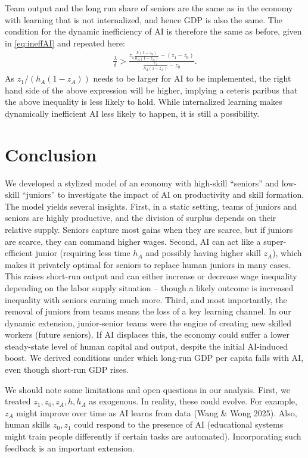 \documentclass[12pt]{article}
\begin{document}
{Team output and the long run share of seniors are the same as in the economy with learning that is not internalized, and hence GDP is also the same. The condition for the dynamic inefficiency of AI is therefore the same as before, given in \eqref{eq:ineffAI} and repeated here:
\begin{align*}
\frac{\lambda}{\delta}>\frac{z_1\frac{h(1-z_0)}{h_A(1-z_A)}-(z_1-z_0)}{\frac{z_1}{h_A(1-z_A)}-z_0}.
\end{align*}
As $z_1/(h_A(1-z_A))$ needs to be larger for AI to be implemented, the right hand side of the above expression will be higher, implying a ceteris paribus that the above inequality is less likely to hold. While internalized learning makes dynamically inefficient AI less likely to happen, it is still a possibility. 


\section{Conclusion}\label{discussion-related-literature-and-policy-implications}
We developed a stylized model of an economy with high-skill ``seniors''
and low-skill ``juniors'' to investigate the impact of AI on
productivity and skill formation. The model yields several insights.
{First}, in a static setting, teams of juniors and seniors are
highly productive, and the division of surplus depends on their relative
supply. Seniors capture most gains when they are scarce, but if juniors
are scarce, they can command higher wages. {Second}, AI can act
like a super-efficient junior (requiring less time \(h_A\) and possibly
having higher skill \(z_A\)), which makes it privately optimal for
seniors to replace human juniors in many cases. This raises short-run
output and can either increase or decrease wage inequality depending on
the labor supply situation -- though a likely outcome is increased
inequality with seniors earning much more. {Third}, and most
importantly, the removal of juniors from teams means the {loss of
a key learning channel}. In our dynamic extension, junior-senior teams
were the engine of creating new skilled workers (future seniors). If AI
displaces this, the economy could suffer a {lower steady-state
level of human capital and output}, despite the initial AI-induced
boost. We derived conditions under which long-run GDP per capita falls
with AI, even though short-run GDP rises.

We should note some {limitations and open questions} in our
analysis. First, we treated \(z_1, z_0, z_A, h, h_A\) as exogenous. In reality, these
could evolve. For example, \(z_A\) might improve over time as AI
learns from data (Wang \& Wong 2025). Also, human
skills \(z_0, z_1\) could respond to the presence of AI (educational
systems might train people differently if certain tasks are
automated). Incorporating such feedback is an important extension.

}
\end{document}
